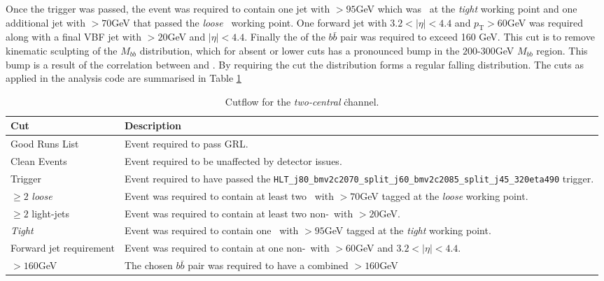 		Once the trigger was passed, the event was required to contain one jet with \pt$>95$GeV which was \btagged\, at the \textit{tight} working point and one additional jet with \pt$>70$GeV that passed the \textit{loose} \btag\, working point. One forward jet with $3.2 < |\eta| < 4.4$ and $p_{\text{T}}>60$GeV was required along with a final VBF jet with \pt$>20$GeV and $|\eta| < 4.4$. Finally the \pt of the $b\bar{b}$ pair was required to exceed 160 GeV. This cut is to remove kinematic sculpting of the $M_{bb}$ distribution, which for absent or lower \ptbb cuts has a pronounced bump in the $200$-$300$GeV $M_{bb}$ region. This bump is a result of the correlation between \mbb and \ptbb. By requiring the \ptbb cut the \mbb distribution forms a regular falling distribution. The cuts as applied in the analysis code are summarised in Table \ref{tab:cuts}

		\begin{table}[h]
		\caption[\textit{Two-central} channel event cuts]{Cutflow for the \textit{two-central} \VBFHBB\. channel.}
		\label{tab:cuts}
		\medskip
		\centering
		\begin{tabularx}{\textwidth}{p{2.5cm} X}\toprule
			Cut & Description \\\midrule
			Good Runs List & Event required to pass GRL.\\
			Clean Events & Event required to be unaffected by detector issues.\\
			Trigger & Event required to have passed the \texttt{HLT\_j80\_bmv2c2070\_split\_\-j60\_bmv2c2085\_split\_j45\_320eta490} trigger.\\
			$\geq2$ \textit{loose} & Event was required to contain at least two \bjets\ with \pt$>70$GeV tagged at the \textit{loose} working point.\\
			$\geq2$ light-jets & Event was required to contain at least two non-\bjets\ with \pt$>20$GeV.\\
			\textit{Tight} \bjet & Event was required to contain one \bjet\ with \pt$>95$GeV tagged at the \textit{tight} working point.\\
			Forward jet requirement & Event was required to contain at one non-\bjet\ with \pt$>60$GeV and $3.2 < |\eta| < 4.4$.\\
			\ptbb$>160$GeV & The chosen $b\bar{b}$ pair was required to have a combined \pt$>160$GeV \\
			\bottomrule
		\end{tabularx}
	\end{table}

